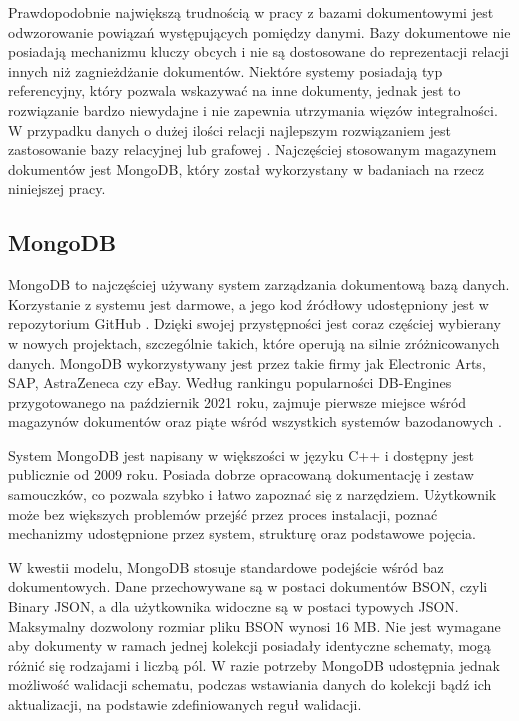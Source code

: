 \documentclass[a4paper,twoside,12pt]{book}
\begin{document}
Prawdopodobnie największą trudnością w pracy z bazami dokumentowymi jest odwzorowanie powiązań występujących pomiędzy danymi. Bazy dokumentowe nie posiadają mechanizmu kluczy obcych i nie są dostosowane do reprezentacji relacji innych niż zagnieżdżanie dokumentów. Niektóre systemy posiadają typ referencyjny, który pozwala wskazywać na inne dokumenty, jednak jest to rozwiązanie bardzo niewydajne i nie zapewnia utrzymania więzów integralności. W przypadku danych o dużej ilości relacji najlepszym rozwiązaniem jest zastosowanie bazy relacyjnej lub grafowej \cite{mongodb-as-an-efficient-graph-database}. Najczęściej stosowanym magazynem dokumentów jest MongoDB, który został wykorzystany w badaniach na rzecz niniejszej pracy.

\subsection{MongoDB}

MongoDB to najczęściej używany system zarządzania dokumentową bazą danych. Korzystanie z systemu jest darmowe, a jego kod źródłowy udostępniony jest w repozytorium GitHub \cite{bib:mongo-git}. Dzięki swojej przystępności jest coraz częściej wybierany w nowych projektach, szczególnie takich, które operują na silnie zróżnicowanych danych. MongoDB wykorzystywany jest przez takie firmy jak Electronic Arts, SAP, AstraZeneca czy eBay. Według rankingu popularności DB-Engines przygotowanego na październik 2021 roku, zajmuje pierwsze miejsce wśród magazynów dokumentów oraz piąte wśród wszystkich systemów bazodanowych \cite{bib:db-engines-ranking}. 

System MongoDB jest napisany w większości w języku C++ i dostępny jest publicznie od 2009 roku. Posiada dobrze opracowaną dokumentację i zestaw samouczków, co pozwala szybko i łatwo zapoznać się z narzędziem. Użytkownik może bez większych problemów przejść przez proces instalacji, poznać mechanizmy udostępnione przez system, strukturę oraz podstawowe pojęcia. 

W kwestii modelu, MongoDB stosuje standardowe podejście wśród baz dokumentowych. Dane przechowywane są w postaci dokumentów BSON, czyli Binary JSON, a dla użytkownika widoczne są w postaci typowych JSON. Maksymalny dozwolony rozmiar pliku BSON wynosi 16 MB. Nie jest wymagane aby dokumenty w ramach jednej kolekcji posiadały identyczne schematy, mogą różnić się rodzajami i liczbą pól. W razie potrzeby MongoDB udostępnia jednak możliwość walidacji schematu, podczas wstawiania danych do kolekcji bądź ich aktualizacji, na podstawie zdefiniowanych reguł walidacji. 
\end{document}
